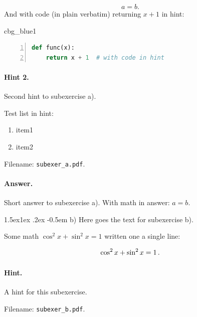 \n\documentclass[%
oneside,                 %
final,                   %
10pt]{article}
\makeatletter
\newenvironment{_cod_tight}[1]{
   \def\FrameCommand{\colorbox{#1}}
   \FrameRule0.6pt\MakeFramed {\FrameRestore}\vskip3mm}
   {\vskip0mm\endMakeFramed}
\newenvironment{cod}[1]{
\bgroup\rmfamily
\fboxsep=0mm\relax
\begin{_cod_tight}{#1}
\list{}{\parsep=-2mm\parskip=0mm\topsep=0pt\leftmargin=2mm
\rightmargin=2\leftmargin\leftmargin=4pt\relax}
\item\relax}
{\endlist\end{_cod_tight}\egroup}
\newenvironment{doconceexercise}{}{}
\newcommand\subex{\@startsection{paragraph}{4}{\z@}%
                  {1.5ex\@plus1ex \@minus.2ex}%
                  {-0.5em}%
                  {\normalfont\normalsize\bfseries}}
\theoremstyle{definition}
\makeatother
\begin{document}
\begin{enumerate}
\begin{doconceexercise}
\[ a=b. \]
And with code (in plain verbatim) returning $x+1$ in hint:




\begin{cod}{cbg_blue1}\begin{lstlisting}[language=Python,style=myspeciallststyle,numbers=left,numberstyle=\tiny,stepnumber=3,numbersep=15pt,xleftmargin=1mm]
def func(x):
    return x + 1  # with code in hint

\end{lstlisting}\end{cod}
\noindent




\paragraph{Hint 2.}
Second hint to subexercise a).

Test list in hint:

\begin{enumerate}
\item item1

\item item2
\end{enumerate}

\noindent
\noindent Filename: \Verb!subexer_a.pdf!.

\paragraph{Answer.}
Short answer to subexercise a).
With math in answer: $a=b$.


\subex{b)}
Here goes the text for subexercise b).

Some math $\cos^2 x + \sin^2 x = 1$ written one a single line:

\[ \cos^2 x + \sin^2 x = 1 \thinspace .\]


\paragraph{Hint.}
A hint for this subexercise.

\noindent Filename: \Verb!subexer_b.pdf!.


\end{doconceexercise}
\end{enumerate}
\end{document}
